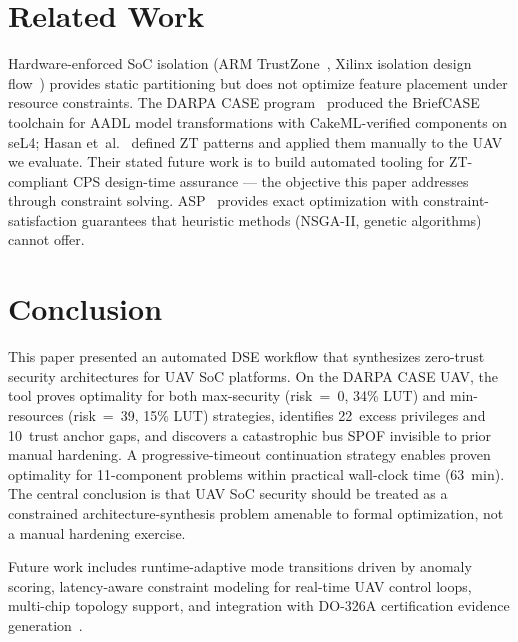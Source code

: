 \documentclass[conference]{IEEEtran}
\begin{document}
\section{Related Work}

Hardware-enforced SoC isolation (ARM TrustZone~\cite{arm_tz}, Xilinx
isolation design flow~\cite{xilinx_idf}) provides static partitioning
but does not optimize feature placement under resource constraints.
The DARPA CASE program~\cite{darpa_case} produced the BriefCASE toolchain
for AADL model transformations with CakeML-verified components on seL4;
Hasan et~al.~\cite{hasan_saecps,hasan_jsys} defined ZT patterns and
applied them manually to the UAV we evaluate. Their stated future work
is to build automated tooling for ZT-compliant CPS design-time
assurance --- the objective this paper addresses through constraint
solving. ASP~\cite{gebser_asp} provides exact optimization with
constraint-satisfaction guarantees that heuristic methods (NSGA-II,
genetic algorithms) cannot offer.

\section{Conclusion}

This paper presented an automated DSE workflow that synthesizes
zero-trust security architectures for UAV SoC platforms. On the DARPA
CASE UAV, the tool proves optimality for both max-security (risk~=~0,
34\% LUT) and min-resources (risk~=~39, 15\% LUT) strategies, identifies
22~excess privileges and 10~trust anchor gaps, and discovers a
catastrophic bus SPOF invisible to prior manual hardening. A
progressive-timeout continuation strategy enables proven optimality
for 11-component problems within practical wall-clock time (63~min).
The central conclusion is that UAV SoC security should be treated as a
constrained architecture-synthesis problem amenable to formal
optimization, not a manual hardening exercise.

Future work includes runtime-adaptive mode transitions driven by anomaly
scoring, latency-aware constraint modeling for real-time UAV control
loops, multi-chip topology support, and integration with DO-326A
certification evidence generation~\cite{do326a}.

\balance


\end{document}
